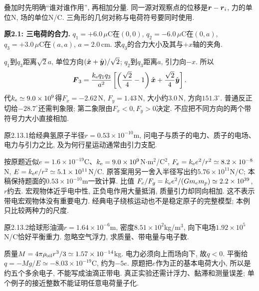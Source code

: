 \label{tb:coulombexamples}
叠加时先明确“谁对谁作用”, 再相加分量. 同一源对观察点的位移是$\boldsymbol{r}-\boldsymbol{r}_i$, 力的单位N, 场的单位N/C. 三角形的几何对称与电荷符号要同时使用.
\begin{example}
\textbf{原2.1: 三电荷的合力.} 
$q_1=+6.0\,\mu\mathrm C$在$(0,0)$, $q_2=-6.0\,\mu\mathrm C$在$(0,a)$, $q_3=+3.0\,\mu\mathrm C$在$(a,a)$, $a=2.0\,\mathrm{cm}$. 求$q_3$的合力大小及其与$+x$轴的夹角.
\end{example}
\begin{solution}
$q_1$到$q_3$距离$\sqrt2a$, 单位方向$(\hat{\boldsymbol{x}}+\hat{\boldsymbol{y}})/\sqrt2$; $q_2$到$q_3$距离$a$, 引力向$-x$. 所以
\[\boldsymbol{F}_3=\frac{k_{\mathrm e} q_1q_3}{a^2}\left[\left(\frac{\sqrt2}{4}-1\right)\hat{\boldsymbol{x}}+\frac{\sqrt2}{4}\hat{\boldsymbol{y}}\right].\]
代$k_{\mathrm e}\simeq9.0\times10^9$得$F_x=-2.62\,\mathrm N$, $F_y=1.43\,\mathrm N$, 大小约$3.0\,\mathrm N$, 方向$151.3^\circ$. 普通反正切给$-28.7^\circ$还需判象限; 第二象限由$F_x<0,F_y>0$决定. 不应把不同方向的两个带符号力大小直接相加.
\end{solution}
\begin{example}\label{ex:hydrogen}
原2.13.1给经典氢原子半径$r=0.53\times10^{-10}$m, 问电子与质子的电力、质子的电场、电力与引力之比, 及为何行星运动通常由引力支配.
\end{example}
\begin{solution}
按原题近似$e=1.6\times10^{-19}$C、$k_{\mathrm e}=9.0\times10^9$N$\cdot$m$^2$/C$^2$, $F_e=k_{\mathrm e} e^2/r^2\simeq8.2\times10^{-8}$N, $E=k_{\mathrm e} e/r^2\simeq5.1\times10^{11}$N/C. 原答案用另一舍入半径写出约$5.76\times10^{11}$N/C; 本稿保持题面的$0.53\times10^{-10}$m一致计算. 比值
$F_e/F_g=k_{\mathrm e} e^2/(Gm_em_p)\simeq2.2\times10^{39}$, $r$约去. 宏观物体近乎电中性, 正负电作用大量抵消, 质量引力却同向相加. 这不表示带电宏观物体没有重要电力. 经典电子绕核运动也不是稳定原子的完整模型; 本例只比较两种力的尺度.
\end{solution}

\begin{example}\label{ex:millikan}
原2.13.2给球形油滴$r=1.64\times10^{-6}$m, 密度$8.51\times10^2$kg/m$^3$, 向下电场$1.92\times10^5$N/C恰好平衡重力. 忽略空气浮力, 求质量、带电量与电子数.
\end{example}
\begin{solution}
质量$M=4\pi\rho_{\rm oil}r^3/3\simeq1.57\times10^{-14}$kg. 电力必须向上而场向下, 故$q<0$. 平衡给$q=-Mg/E\simeq-8.03\times10^{-19}$C, 约为$-5e$. 原题把$e$作为正的基本电荷大小, 所以是约五个多余电子, 不能写成油滴正带电. 真正实验还需计浮力、黏滞和测量误差; 单个例子的接近整数不能证明任意电荷量子化.
\end{solution}

